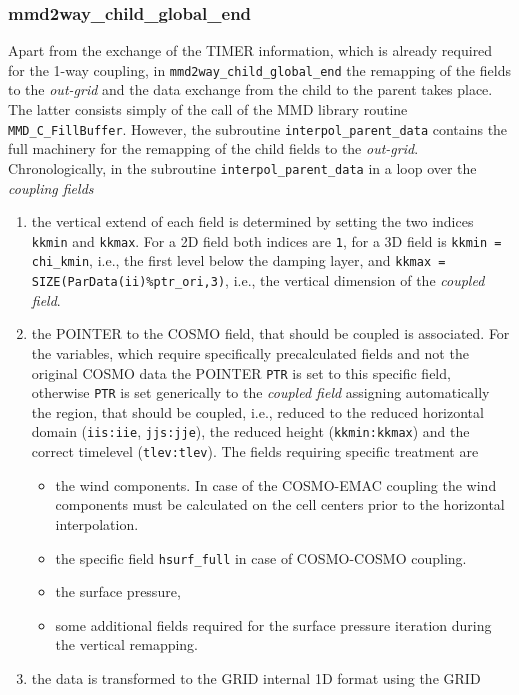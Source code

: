 \documentclass[11pt,twoside]{article}
\begin{document}
\subsubsection{mmd2way\_child\_global\_end}
Apart from the exchange of the TIMER information, which is already required
for the 1-way coupling, in \verb|mmd2way_child_global_end| the remapping 
of the fields to the {\it out-grid} and the data exchange from the child to the
parent takes place. The latter consists simply of the call of the MMD library
routine \verb|MMD_C_FillBuffer|.
However, the subroutine \verb|interpol_parent_data| contains the full
machinery for the remapping of the child fields to the {\it out-grid}.
Chronologically, in the subroutine \verb|interpol_parent_data| in a
loop over the {\it coupling fields}
\begin{enumerate}
\item the vertical extend of each field is determined by setting the
two indices \verb|kkmin| and \verb|kkmax|. For a 2D field both indices
are \verb|1|, for a 3D field is \verb|kkmin = chi_kmin|, i.e., the
first level below the damping layer, and 
\verb|kkmax = SIZE(ParData(ii)%ptr_ori,3)|,
i.e., the vertical dimension of the {\it coupled field}.
\item the {\footnotesize POINTER} to the COSMO field, that should be coupled is
associated. For the variables, which require specifically
precalculated fields and not 
the original COSMO data the {\footnotesize POINTER} \verb|PTR| is set
to this specific 
field, otherwise \verb|PTR| is set generically to the {\it coupled field}
assigning automatically the region, that should be coupled, i.e.,
reduced to the reduced horizontal domain
(\verb|iis:iie|, \verb|jjs:jje|),
the reduced height (\verb|kkmin:kkmax|) and the correct timelevel 
(\verb|tlev:tlev|).
The fields requiring specific treatment are
\begin{itemize}
\item the wind components. In case of the COSMO-EMAC coupling the wind components must be calculated on the cell centers prior to the horizontal interpolation.
\item the specific field \verb|hsurf_full| in case of COSMO-COSMO coupling.
\item the surface pressure,
\item some additional fields required for the surface pressure
iteration during the  vertical remapping.
\end{itemize}
\item the data is transformed to the
GRID internal 1D format using the GRID

\end{enumerate}
\end{document}
